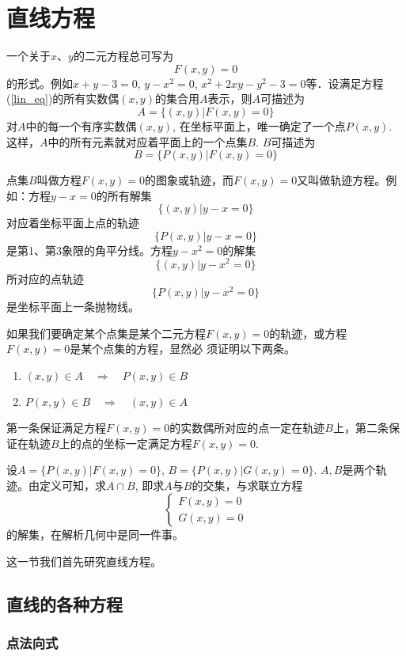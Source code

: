 \section{直线方程}
一个关于$x$、$y$的二元方程总可写为
\begin{equation}\label{lin_eq}
 F (x,y) =0   
\end{equation}
的形式。例如$x+y-3=0$, $y-x^2=0$, $x^2+2xy-y^2-3=0$等．设满足方程(\ref{lin_eq})的所有实数偶$(x,y)$的集合用$A$表示，则$A$可描述为
\[A= \{ (x,y) |F (x,y) =0\} \]
对$A$中的每一个有序实数偶$(x,y)$, 在坐标平面上，唯一确定了一个点$P(x,y)$. 这样，$A$中的所有元素就对应着平面上的一个点集$B$. $B$可描述为
\[B= \{P (x,y) |F (x,y) =0\}\]

点集$B$叫做方程$F(x,y)=0$的图象或轨迹，而$F(x,y)=0$又叫做轨迹方程。例如：方程$y-x=0$的所有解集
\[\{ (x,y) |y-x=0\}\]
对应着坐标平面上点的轨迹
\[\{P (x,y) |y-x=0\} \]
是第1、第3象限的角平分线。方程$y-x^2=0$的解集
\[\{ (x,y) |y-x^2=0\}\]
所对应的点轨迹
\[\{P (x,y) |y-x^2=0\}\]
是坐标平面上一条抛物线。

如果我们要确定某个点集是某个二元方程$F(x,y)=0$的轨迹，或方程$F(x,y)=0$是某个点集的方程，显然必
须证明以下两条。
\begin{enumerate}
    \item $(x,y)\in A\quad \Rightarrow\quad P(x,y)\in B$
    \item $P (x,y) \in B\quad \Rightarrow\quad  (x,y) \in A$
\end{enumerate}
第一条保证满足方程$F(x,y)=0$的实数偶所对应的点一定在轨迹$B$上，第二条保证在轨迹$B$上的点的坐标一定满足方程$F(x,y)=0$.

设$A= \{P (x,y) |F (x,y) =0\}$, $B= \{P (x,y) |G (x,y) =0\}$. 
$A,B$是两个轨迹。由定义可知，求$A\cap B$, 即求$A$与$B$的交集，与求联立方程
\[\begin{cases}
   F (x,y) =0\\
   G (x,y) =0 
\end{cases}\]
的解集，在解析几何中是同一件事。

这一节我们首先研究直线方程。

\subsection{直线的各种方程}
\subsubsection{点法向式}

